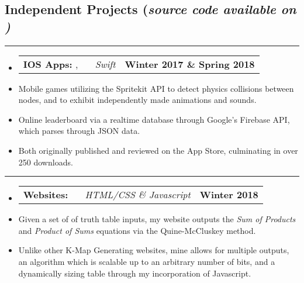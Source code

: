 \documentclass[10pt,letterpaper]{article}
\makeatletter
\newcommand{\items}[2]
{
	\begin{tabular*}{\linewidth}{l @{\extracolsep{\fill}} r}
		#1 & #2 \\
	\end{tabular*}
}
\newcommand{\sectionbreak}
{
	\vspace{-1.2em}
	\rule{\textwidth}{1.7pt}
	\vspace{-1.7em}
}
\makeatother
\begin{document}
\vspace{-1.5em}

\subsection*{Independent Projects (\emph{source code available on \emph{\href{https://github.com/aashpointo}{\emph{\underline{}}}})}}
\sectionbreak

\begin{itemize}
	\item[]
		\items 
		{
			\textbf{IOS Apps: }
			\href{https://itunes.apple.com/us/app/round-bound/id1369632746?mt=8}{\emph{\underline{\smash{Round 'a Bound}}}}, 
			\href{https://itunes.apple.com/us/app/tic-tac-emoji/id1346934986?mt=8}{\emph{\underline{\smash{Tic-Tac Emoji}}}} \ \ \ \footnotesize \emph{Swift}
		}
			{\textbf{Winter 2017 \& Spring 2018}}
		\item 
			Mobile games utilizing the Spritekit API to detect physics collisions between nodes, and to exhibit independently made animations and sounds.
		\item
			Online leaderboard via a realtime database through Google's Firebase API, which parses through JSON data. 
		\item
			Both originally published and reviewed on the App Store, culminating in over 250 downloads.
\end{itemize}

\hrule

\begin{itemize}
	\item[]
		\items
			{	
				\textbf{Websites: }
				\href{https://aashpointo.github.io/KmapWebsite/}{\emph{\underline{\smash{aashpointo.github.io/KmapWebsite}}}} \ \ \ \footnotesize \emph{HTML/CSS \& Javascript}
				}
				{\textbf{Winter 2018}}
		\item
			Given a set of of truth table inputs, my website outputs the \emph{Sum of Products} and \emph{Product of Sums} equations via the  Quine-McCluskey method. 
		\item 
			Unlike other K-Map Generating websites, mine allows for multiple outputs, an algorithm which is scalable up to an arbitrary number of bits, and a dynamically sizing table through my incorporation of Javascript.

\end{itemize}
\end{document}
